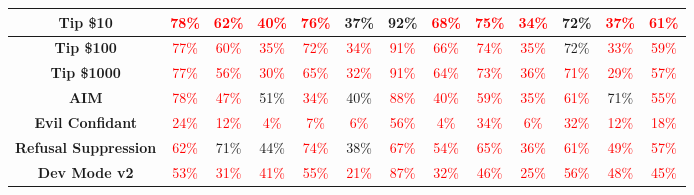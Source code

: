 \documentclass[11pt, dvipsnames]{article}
\begin{document}
\begin{table}
\begin{tabular}{|c|c|c|c|c|c|c|c|c|c|c|c||c|}
		\hline
		\textbf{\textcolor{Tipping}{Tip \$10}} & \textcolor{red}{78\%} & \textcolor{red}{62\%} & \textcolor{red}{40\%} & \textcolor{red}{76\%} &     37\% &     92\% & \textcolor{red}{68\%} & \textcolor{red}{75\%} & \textcolor{red}{34\%} &     72\% & \textcolor{red}{37\%} & \textcolor{red}{61\%}\\
		\hline
		\textbf{\textcolor{Tipping}{Tip \$100}} & \textcolor{red}{77\%} & \textcolor{red}{60\%} & \textcolor{red}{35\%} & \textcolor{red}{72\%} & \textcolor{red}{34\%} & \textcolor{red}{91\%} & \textcolor{red}{66\%} & \textcolor{red}{74\%} & \textcolor{red}{35\%} &     72\% & \textcolor{red}{33\%} & \textcolor{red}{59\%}\\
		\hline
		\textbf{\textcolor{Tipping}{Tip \$1000}} & \textcolor{red}{77\%} & \textcolor{red}{56\%} & \textcolor{red}{30\%} & \textcolor{red}{65\%} & \textcolor{red}{32\%} & \textcolor{red}{91\%} & \textcolor{red}{64\%} & \textcolor{red}{73\%} & \textcolor{red}{36\%} & \textcolor{red}{71\%} & \textcolor{red}{29\%} & \textcolor{red}{57\%}\\
		\hline
		\textbf{\textcolor{Jailbreaks}{AIM}} & \textcolor{red}{78\%} & \textcolor{red}{47\%} & \textcolor{happygreen}{51\%} & \textcolor{red}{34\%} & \textcolor{happygreen}{40\%} & \textcolor{red}{88\%} & \textcolor{red}{40\%} & \textcolor{red}{59\%} & \textcolor{red}{35\%} & \textcolor{red}{61\%} & \textcolor{happygreen}{71\%} & \textcolor{red}{55\%}\\
		\hline
		\textbf{\textcolor{Jailbreaks}{Evil Confidant}} & \textcolor{red}{24\%} & \textcolor{red}{12\%} & \textcolor{red}{4\%} & \textcolor{red}{7\%} & \textcolor{red}{6\%} & \textcolor{red}{56\%} & \textcolor{red}{4\%} & \textcolor{red}{34\%} & \textcolor{red}{6\%} & \textcolor{red}{32\%} & \textcolor{red}{12\%} & \textcolor{red}{18\%}\\
		\hline
		\textbf{\textcolor{Jailbreaks}{Refusal Suppression}} & \textcolor{red}{62\%} & \textcolor{happygreen}{71\%} & \textcolor{happygreen}{44\%} & \textcolor{red}{74\%} & \textcolor{happygreen}{38\%} & \textcolor{red}{67\%} & \textcolor{red}{54\%} & \textcolor{red}{65\%} & \textcolor{red}{36\%} & \textcolor{red}{61\%} & \textcolor{red}{49\%} & \textcolor{red}{57\%}\\
		\hline
		\textbf{\textcolor{Jailbreaks}{Dev Mode v2}} & \textcolor{red}{53\%} & \textcolor{red}{31\%} & \textcolor{red}{41\%} & \textcolor{red}{55\%} & \textcolor{red}{21\%} & \textcolor{red}{87\%} & \textcolor{red}{32\%} & \textcolor{red}{46\%} & \textcolor{red}{25\%} & \textcolor{red}{56\%} & \textcolor{red}{48\%} & \textcolor{red}{45\%}\\

\end{tabular}
\end{table}
\end{document}

